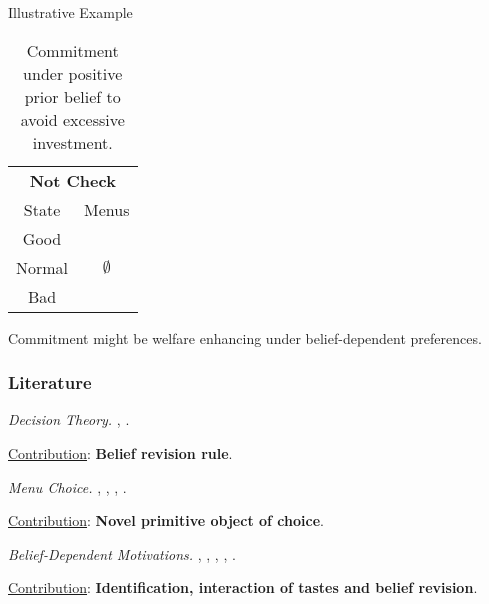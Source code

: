 \documentclass[usenames,dvipsnames,aspectratio=169,11pt, envcountsect, handout]{beamer}
\begin{document}
\begin{frame}[noframenumbering]{Illustrative Example}
\begin{table}[H]
		\begin{minipage}{0.29\textwidth}
			\centering
			\begin{tabular}{c | c}
				\multicolumn{2}{c}{\textbf{Not Check}}   \\
				State  & Menus                           \\
				\hline
				Good   & \multirow{3}{*}{ \(\emptyset\)} \\
				Normal &                                 \\
				Bad    &                                 \\
			\end{tabular}
			\vspace{0.5cm} %
		\end{minipage}
		\caption{Commitment under positive prior belief to avoid excessive investment.} %
		\label{tab:commitment}
	\end{table}

	\vfill

	Commitment might be welfare enhancing under belief-dependent preferences.

\end{frame}

\begin{frame}\frametitle{Literature}

	\begin{wideitemize}
		\item \textit{Decision Theory.} \cite{liangInformationdependentExpectedUtility2017}, \cite{dillenbergerAdditivebeliefbasedPreferences2020} \cite{rommeswinkelPreferenceKnowledge2023}.

		\vspace{0.3cm}
		\underline{Contribution}: \textbf{Belief revision rule}.
		\item \textit{Menu Choice.} \cite{gulTemptationSelfControl2001}, \cite{ozdenorenCompletingStateSpace2002}, \cite{epsteinAxiomaticModelNonBayesian2006}, \cite{epsteinColdFeet2007}.

		\vspace{0.3cm}
		\underline{Contribution}: \textbf{Novel primitive object of choice}.
		\item \textit{Belief-Dependent Motivations.} \cite{brunnermeierOptimalExpectations2005}, \cite{eliazCanAnticipatoryFeelings2006}, \cite{benabou2016mindful}, \cite{golmanInformationAvoidance2017}, \cite{battigalliBeliefdependentMotivationsPsychological2022}.

		\vspace{0.3cm}
		\underline{Contribution}: \textbf{Identification, interaction of tastes and belief revision}.
	\end{wideitemize}

\end{frame}
\end{document}
